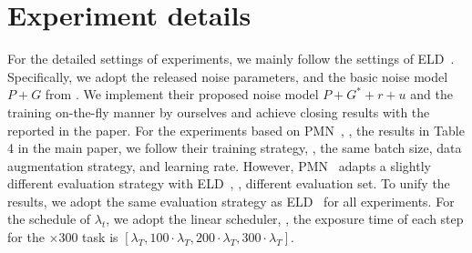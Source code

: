 \documentclass[10pt,twocolumn,letterpaper]{article}
\begin{document}
\section{Experiment details}
For the detailed settings of experiments, we mainly follow the settings of ELD~\cite{wei2020physics}. Specifically, we adopt the released noise parameters, and the basic noise model $P+G$ from \cite{wei2020physics}. We implement their proposed noise model $P+G^*
+r+u$ and the training on-the-fly manner by ourselves and achieve closing results with the reported in the paper. For the experiments based on PMN~\cite{feng2022learnability}, \eg, the results in Table 4 in the main paper, we follow their training strategy, \eg, the same batch size, data augmentation strategy, and learning rate. However, PMN~\cite{feng2022learnability} adapts a slightly different evaluation strategy with ELD~\cite{wei2020physics}, \eg, different evaluation set. To unify the results, we adopt the same evaluation strategy as ELD~\cite{wei2020physics} for all experiments. 
For the schedule of $\lambda_t$, we adopt the linear scheduler, \eg, the exposure time of each step for the $\times 300$ task is $[\lambda_T, 100 \cdot \lambda_T, 200 \cdot \lambda_T, 300\cdot \lambda_T]$.
\end{document}

